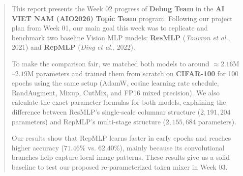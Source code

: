 \begin{abstract}
This report presents the Week 02 progress of \textbf{Debug Team} in the \textbf{AI VIET NAM (AIO2026) Topic Team} program. Following our project plan from Week 01, our main goal this week was to replicate and benchmark two baseline Vision MLP models: \textbf{ResMLP} (\textit{Touvron et al.}, 2021) and \textbf{RepMLP} (\textit{Ding et al.}, 2022). 

To make the comparison fair, we matched both models to around $\approx 2.16\text{M}$--$2.19\text{M}$ parameters and trained them from scratch on \textbf{CIFAR-100} for 100 epochs using the same setup (AdamW, cosine learning rate schedule, RandAugment, Mixup, CutMix, and FP16 mixed precision). We also calculate the exact parameter formulas for both models, explaining the difference between ResMLP's single-scale columnar structure ($2,191,204$ parameters) and RepMLP's multi-stage structure ($2,155,684$ parameters). 

Our results show that RepMLP learns faster in early epochs and reaches higher accuracy ($71.46\%$ vs. $62.40\%$), mainly because its convolutional branches help capture local image patterns. These results give us a solid baseline to test our proposed re-parameterized token mixer in Week 03.
\end{abstract}
